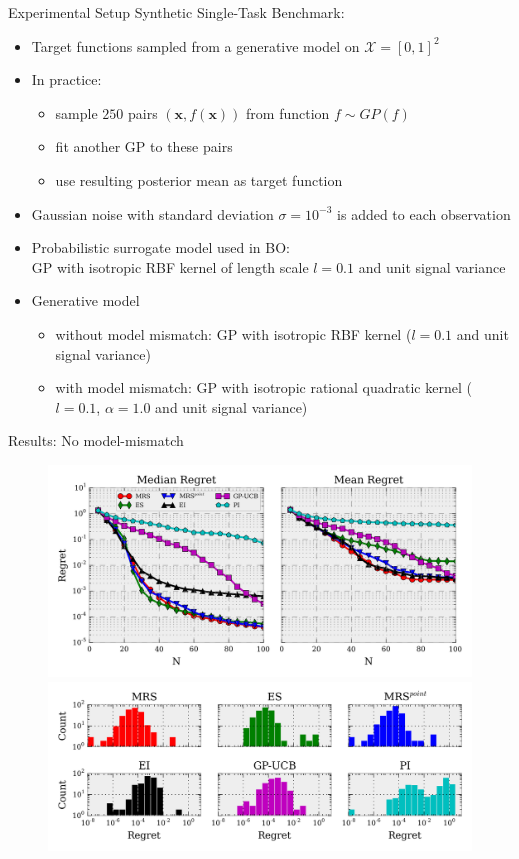 \documentclass[11pt]{beamer}
\begin{document}
\begin{frame}{Experimental Setup}
Synthetic Single-Task Benchmark:
\begin{itemize}
 \item Target functions sampled from a generative model on $\mathcal{X} = [0, 1]^2$ 
 \item In practice: 
   \begin{itemize} 
   \item sample $250$ pairs $(\mathbf{x}, f(\mathbf{x}))$ from function $f \sim GP(f)$
   \item fit another GP to these pairs
   \item use resulting posterior mean as target function
   \end{itemize}
 \item Gaussian noise with standard deviation $\sigma =10^{-3}$ is added to each observation
 \item Probabilistic surrogate model used in BO:\\ GP with isotropic RBF kernel of length scale $l = 0.1$ and unit signal variance
 \pause
 \item Generative model
    \begin{itemize} 
    \item without model mismatch: GP with isotropic RBF kernel ($l = 0.1$ and unit signal variance)
    \item with model mismatch:  GP with isotropic rational quadratic kernel ($l = 0.1$, $\alpha=1.0$ and unit signal variance)
    \end{itemize}
\end{itemize}
\end{frame}


\begin{frame}{Results: No model-mismatch}
\begin{figure}
\centering
\includegraphics[width=.7\columnwidth]{../pics/empirical_comparison} \\
\includegraphics[width=.7\columnwidth]{../pics/hist}
\end{figure}
\end{frame}
\end{document}
